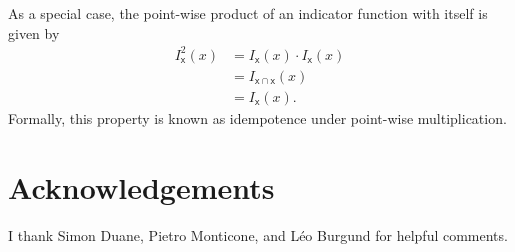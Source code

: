 \documentclass[
  letterpaper,
  DIV=11,
  numbers=noendperiod]{scrartcl}
\begin{document}
As a special case, the point-wise product of an indicator function with
itself is given by \begin{align*}
I^{2}_{\mathsf{x}} (x)
&=
I_{\mathsf{x}} (x)
\cdot
I_{\mathsf{x}} (x)
\\
&=
I_{\mathsf{x} \cap \mathsf{x}} (x)
\\
&=
I_{\mathsf{x}} (x).
\end{align*} Formally, this property is known as idempotence under
point-wise multiplication.

\section*{Acknowledgements}\label{acknowledgements}

I thank Simon Duane, Pietro Monticone, and Léo Burgund for helpful
comments.
\end{document}
